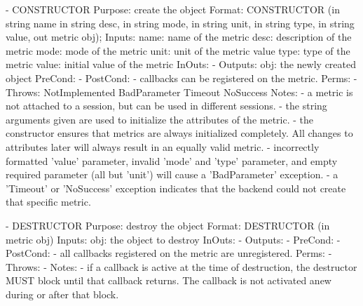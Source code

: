  
 \begin{myspec}
 
    - CONSTRUCTOR
      Purpose:  create the object
      Format:   CONSTRUCTOR        (in  string   name
                                    in  string   desc,
                                    in  string   mode,
                                    in  string   unit,
                                    in  string   type,
                                    in  string   value,
                                    out metric   obj);
      Inputs:   name:               name of the metric
                desc:               description of the metric
                mode:               mode of the metric
                unit:               unit of the metric value
                type:               type of the metric
                value:              initial value of the metric
      InOuts:   -
      Outputs:  obj:                the newly created object
      PreCond:  -
      PostCond: - callbacks can be registered on the metric.
      Perms:    -
      Throws:   NotImplemented
                BadParameter
                Timeout
                NoSuccess
      Notes:    - a metric is not attached to a session, but
                  can be used in different sessions.
                - the string arguments given are used to
                  initialize the attributes of the metric.
                - the constructor ensures that metrics are
                  always initialized completely.  All changes to
                  attributes later will always result in an
                  equally valid metric.
                - incorrectly formatted 'value' parameter, 
                  invalid 'mode' and 'type' parameter, and empty
                  required parameter (all but 'unit') will cause
                  a 'BadParameter' exception.
                - a 'Timeout' or 'NoSuccess' exception indicates
                  that the backend could not create that specific
                  metric.
 
 
    - DESTRUCTOR
      Purpose:  destroy the object
      Format:   DESTRUCTOR         (in  metric obj)
      Inputs:   obj:                the object to destroy
      InOuts:   -
      Outputs:  -
      PreCond:  -
      PostCond: - all callbacks registered on the metric are
                  unregistered.
      Perms:    -
      Throws:   -
      Notes:    - if a callback is active at the time of
                  destruction, the destructor MUST block until
                  that callback returns.  The callback is not
                  activated anew during or after that block.
 

\end{myspec}
